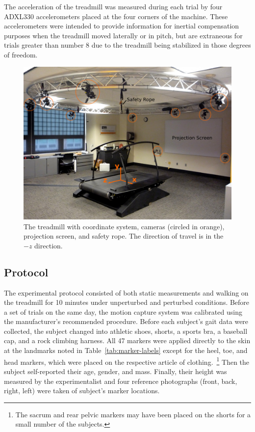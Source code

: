 \documentclass[fleqn,12pt]{wlpeerj}
\begin{document}
The acceleration of the treadmill was measured during each trial by four
ADXL330 accelerometers placed at the four corners of the machine. These
accelerometers were intended to provide information for inertial compensation
purposes when the treadmill moved laterally or in pitch, but are extraneous for
trials greater than number 8 due to the treadmill being stabilized in those
degrees of freedom.
%
\begin{figure}
  \centering
  \includegraphics{figures/treadmill.png}
  \caption{The treadmill with coordinate system, cameras (circled in orange),
    projection screen, and safety rope. The direction of travel is in the $-z$
    direction.}
  \label{fig:treadmill}
\end{figure}

\subsection*{Protocol}
%
The experimental protocol consisted of both static measurements and walking on
the treadmill for 10 minutes under unperturbed and perturbed conditions. Before
a set of trials on the same day, the motion capture system was calibrated using
the manufacturer's recommended procedure. Before each subject's gait data were
collected, the subject changed into athletic shoes, shorts, a sports bra,
a baseball cap, and a rock climbing harness. All 47 markers were applied
directly to the skin at the landmarks noted in Table~\ref{tab:marker-labels}
except for the heel, toe, and head markers, which were placed on the respective
article of clothing.~\footnote{The sacrum and rear pelvic markers may have been
placed on the shorts for a small number of the subjects.} Then the subject
self-reported their age, gender, and mass. Finally, their height was measured
by the experimentalist and four reference photographs (front, back, right,
left) were taken of subject's marker locations.
\end{document}
